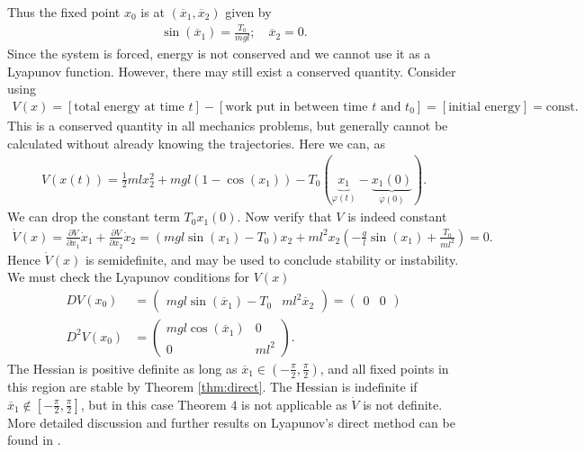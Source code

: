 \begin{ex}
Thus the fixed point $x_0$ is at $(\overline{x}_1, \overline{x}_2)$ given by 
\begin{align}
	\sin(\overline{x}_1) = \frac{T_0}{mgl};\quad \overline{x}_2=0.
\end{align}
Since the system is forced, energy is not conserved and we cannot use it as a Lyapunov function. However, there may still exist a conserved quantity. Consider using
\begin{align}
	V(x) = \left[  \textrm{total energy at time } t \right] - \left[  \textrm{work put in between time } t  \textrm{ and } t_0 \right] = \left[ \textrm{initial energy} \right] =  \textrm{const.}  
\end{align}
This is a conserved quantity in all mechanics problems, but generally cannot be calculated without already knowing the trajectories. Here we can, as
\begin{align}
	V(x(t)) = \frac{1}{2} ml x_2^2 + mgl(1- \cos(x_1)) - T_0(\underbrace{x_1}_{\varphi(t)} - \underbrace{x_1(0)}_{\varphi(0)}).
\end{align}
We can drop the constant term $T_0 x_1(0)$. Now verify that $V$ is indeed constant
\begin{align}
	\dot{V}(x) = \frac{\partial V}{\partial x_1} \dot{x}_1 + \frac{\partial V}{\partial x_2} \dot{x}_2 = \left( mgl \sin(x_1) - T_0\right) x_2 + ml^2x_2 \left( - \frac{g}{l}\sin(x_1) + \frac{T_0}{ml^2} \right) = 0.
\end{align}
Hence $\dot{V}(x)$ is semidefinite, and may be used to conclude stability or instability. We must check the Lyapunov conditions for $V(x)$ 
\begin{subequations}
\begin{align}
	DV(x_0) &= 
\begin{pmatrix}
	mgl \sin(\overline{x}_1) - T_0 & ml^2 \overline{x}_2
\end{pmatrix}
=
\begin{pmatrix}
	0& 0
\end{pmatrix}
\\
D^2V(x_0) &= 
\begin{pmatrix}
	mgl \cos(\overline{x}_1) & 0 \\
	0 & ml^2
\end{pmatrix}.
\end{align}\end{subequations}
The Hessian is positive definite as long as $\overline{x}_1 \in \left(-\frac{\pi }{2}, \frac{\pi }{2}\right)$, and all fixed points in this region are stable by Theorem \ref{thm:direct}. The Hessian is indefinite if $\overline{x}_1 \not \in \left[-\frac{\pi }{2}, \frac{\pi }{2}\right]$, but in this case Theorem 4 is not applicable as $\dot{V}$ is not definite. More detailed discussion and further results on Lyapunov's direct method can be found in \cite{LiapunovDirect}.
 \end{ex}
 
